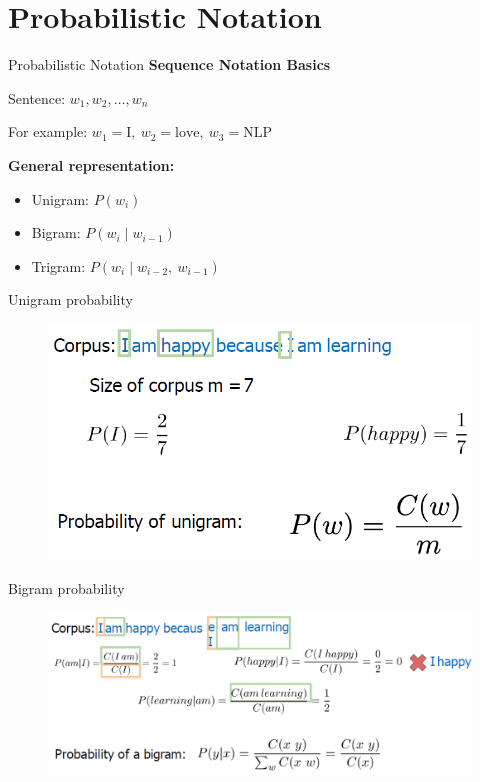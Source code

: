 \section{Probabilistic Notation}
\begin{frame}{Probabilistic Notation}
    \textbf{Sequence Notation Basics}

    Sentence: $w_1, w_2, \ldots, w_n$

    For example: $w_1 = \text{I},\ w_2 = \text{love},\ w_3 = \text{NLP}$

    \vspace{1em}
    \textbf{General representation:}
    \begin{itemize}
        \item Unigram: $P(w_i)$
        \item Bigram: $P(w_i \mid w_{i-1})$
        \item Trigram: $P(w_i \mid w_{i-2},\ w_{i-1})$
    \end{itemize}
\end{frame}

\begin{frame}{Unigram probability}
    \begin{figure}
        \centering
        \includegraphics[width=\textwidth,height=0.8\textheight,keepaspectratio]{images/nlp-intro/unigram-probability.png}
    \end{figure}
\end{frame}

\begin{frame}{Bigram probability}
    \begin{figure}
        \centering
        \includegraphics[width=\textwidth,height=0.8\textheight,keepaspectratio]{images/nlp-intro/bigram-probability.png}
    \end{figure}
\end{frame}

